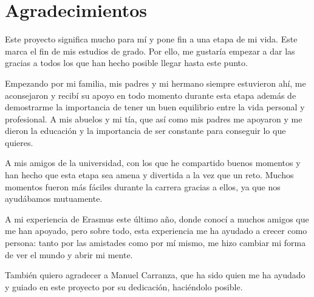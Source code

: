 \chapter*{Agradecimientos}

Este proyecto significa mucho para mí y pone fin a una etapa de mi vida. Este marca el fin de mis estudios
de grado. Por ello, me gustaría empezar a dar las gracias a todos los que han hecho posible llegar hasta este
punto.

Empezando por mi familia, mis padres y mi hermano siempre estuvieron ahí, me aconsejaron y recibí su apoyo en todo momento durante
esta etapa además de demostrarme la importancia de tener un buen equilibrio entre la vida personal y profesional.
A mis abuelos y mi tía, que así como mis padres me apoyaron y me dieron la educación y la importancia de ser constante para conseguir lo que quieres.

A mis amigos de la universidad, con los que he compartido buenos momentos y han hecho que esta etapa sea amena y divertida a la vez que un reto.
Muchos momentos fueron más fáciles durante la carrera gracias a ellos, ya que nos ayudábamos mutuamente.

A mi experiencia de Erasmus este último año, donde conocí a muchos amigos que me han apoyado, pero sobre todo, esta experiencia me ha ayudado
a crecer como persona: tanto por las amistades como por mí mismo, me hizo cambiar mi forma de ver el mundo y abrir mi mente.

También quiero agradecer a Manuel Carranza, que ha sido quien me ha ayudado y guiado en este proyecto por su dedicación, haciéndolo posible.
